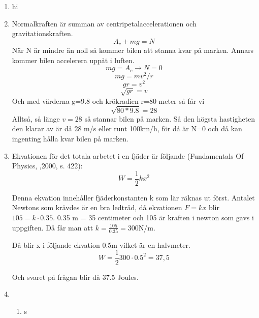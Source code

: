 \documentclass[a4paper,12pt]{article}
\begin{document}
\begin{enumerate}
    \item hi

    \item Normalkraften är summan av centripetalaccelerationen och gravitationskraften.
          $$A_c+mg=N$$
          När N är mindre än noll så kommer bilen att stanna kvar på marken. Annars
          kommer bilen accelerera uppåt i luften.
          $$mg=A_c\rightarrow N=0$$
          $$mg=mv^2/r$$
          $$gr=v^2$$
          $$\sqrt{gr}=v$$
          Och med värderna g=9.8 och krökradien r=80 meter så får vi
          $$\sqrt{80*9.8}=28$$
          Alltså, så länge $v=28$ så stannar bilen på marken. Så den högsta
          hastigheten den klarar av är då 28 m/s eller runt 100km/h, för då är N=0
          och då kan ingenting hålla kvar bilen på marken.

    \item Ekvationen för det totala arbetet i en fjäder är följande (Fundamentals Of Physics, ,2000, s. 422):
    $$W=\frac{1}{2}kx^2$$
    
    Denna ekvation innehåller fjäderkonstanten k som lär räknas ut först.
    Antalet Newtons som krävdes är en bra ledtråd, då ekvationen $F=kx$ 
    blir $105=k\cdot 0.35$. 0.35 m = 35 centimeter och 105 är kraften i newton som 
    gavs i uppgiften. Då får man att $k=\frac{105}{0.35}=300$N/m.

    Då blir x i följande ekvation 0.5m vilket är en halvmeter. 
    $$W=\frac{1}{2}300\cdot 0.5^2=37,5$$

    Och svaret på frågan blir då 37.5 Joules.

    \item 
    \begin{enumerate}
        \item s
    \end{enumerate}
\end{enumerate}
\end{document}
